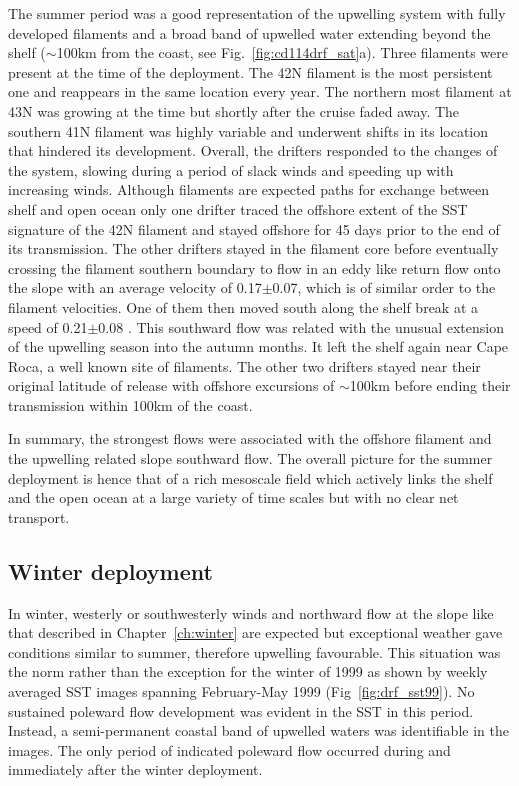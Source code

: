 The summer period was a good representation of the upwelling
system with fully developed filaments and a broad band of upwelled
water extending beyond the shelf ($\sim$100km from the coast, see
Fig.~\ref{fig:cd114drf_sat}a). Three filaments were present at the
time of the deployment. The 42\deg N filament is the most
persistent one and reappears in the same location every year. The
northern most filament at 43\deg N was growing at the time but
shortly after the cruise faded away. The southern 41\deg N
filament was highly variable and underwent shifts in its location
that hindered its development. Overall, the drifters responded to
the changes of the system, slowing during a period of slack winds
and speeding up with increasing winds. Although filaments are
expected paths for exchange between shelf and open ocean only one
drifter traced the offshore extent of the SST signature of the
42\deg N filament and stayed offshore for 45 days prior to the end
of its transmission. The other drifters stayed in the filament
core before eventually crossing the filament southern boundary to
flow in an eddy like return flow onto the slope  with an average
velocity of 0.17$\pm$0.07\velc, which is of similar order to the
filament velocities. One of them then moved south along the shelf
break at a speed of 0.21$\pm$0.08 \velc. This southward flow was
related with the unusual extension of the upwelling season into
the autumn months. It left the shelf again near Cape Roca, a well
known site of filaments. The other two drifters stayed near their
original latitude of release with offshore excursions of
$\sim$100km before ending their transmission within 100km of the
coast.

In summary, the strongest flows were associated with the offshore
filament and the upwelling related slope southward flow. The
overall picture for the summer deployment is hence that of a rich
mesoscale field which actively links the shelf and the open ocean
at a large variety of time scales but with no clear net transport.


\subsection{Winter deployment}

In winter, westerly or southwesterly winds and northward flow  at
the slope like that described in Chapter~\ref{ch:winter} are
expected but exceptional weather gave conditions similar to
summer, therefore upwelling favourable. This situation was the
norm rather than the exception for the winter of 1999 as shown by
weekly averaged SST images spanning February-May 1999
(Fig~\ref{fig:drf_sst99}). No sustained poleward flow development
was evident in the SST in this period. Instead, a semi-permanent
coastal band of upwelled waters was identifiable in the images.
The only period of indicated poleward flow occurred during and
immediately after the winter deployment.

